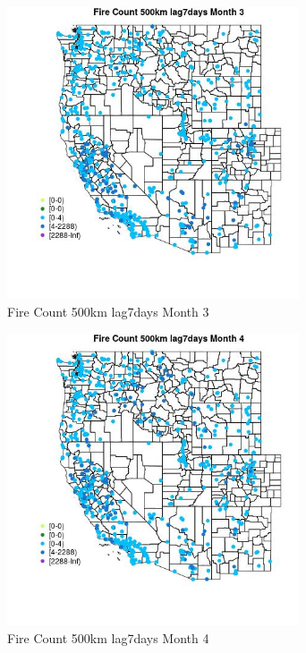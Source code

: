 \begin{figure} 
\centering  
\includegraphics[width=0.77\textwidth]{Code_Outputs/Report_ML_input_PM25_Step4_part_e_de_duplicated_aves_compiled_2019-05-21wNAs_MapObsMo3Fire_Count_500km_lag7days.jpg} 
\caption{\label{fig:Report_ML_input_PM25_Step4_part_e_de_duplicated_aves_compiled_2019-05-21wNAsMapObsMo3Fire_Count_500km_lag7days}Fire Count 500km lag7days Month 3} 
\end{figure} 
 

\begin{figure} 
\centering  
\includegraphics[width=0.77\textwidth]{Code_Outputs/Report_ML_input_PM25_Step4_part_e_de_duplicated_aves_compiled_2019-05-21wNAs_MapObsMo4Fire_Count_500km_lag7days.jpg} 
\caption{\label{fig:Report_ML_input_PM25_Step4_part_e_de_duplicated_aves_compiled_2019-05-21wNAsMapObsMo4Fire_Count_500km_lag7days}Fire Count 500km lag7days Month 4} 
\end{figure} 
 

